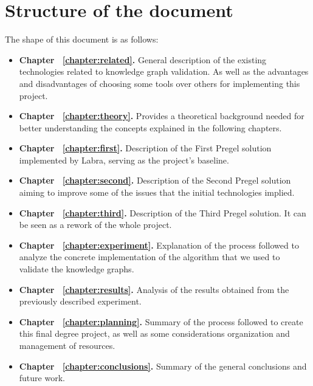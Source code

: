 \section{Structure of the document}

The shape of this document is as follows:

\begin{itemize}
    \item \textbf{Chapter ~\ref{chapter:related}.} General description of the existing technologies related to knowledge graph validation. As well as the advantages and disadvantages of choosing some tools over others for implementing this project.
    \item \textbf{Chapter ~\ref{chapter:theory}.} Provides a theoretical background needed for better understanding the concepts explained in the following chapters.
    \item \textbf{Chapter ~\ref{chapter:first}.} Description of the First Pregel solution implemented by Labra, serving as the project's baseline.
    \item \textbf{Chapter ~\ref{chapter:second}.} Description of the Second Pregel solution aiming to improve some of the issues that the initial technologies implied.
    \item \textbf{Chapter ~\ref{chapter:third}.} Description of the Third Pregel solution. It can be seen as a rework of the whole project.
    \item \textbf{Chapter ~\ref{chapter:experiment}.} Explanation of the process followed to analyze the concrete implementation of the algorithm that we used to validate the knowledge graphs.
    \item \textbf{Chapter ~\ref{chapter:results}.} Analysis of the results obtained from the previously described experiment.
    \item \textbf{Chapter ~\ref{chapter:planning}.} Summary of the process followed to create this final degree project, as well as some considerations organization and management of resources.
    \item \textbf{Chapter ~\ref{chapter:conclusions}.} Summary of the general conclusions and future work.
\end{itemize}